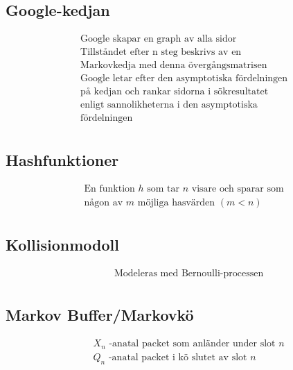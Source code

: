 \begin{multicols}{2}
\subsection{Google-kedjan}
\begin{align*}
  &\text{Google skapar en graph av alla sidor} \\
  &\text{Tillståndet efter n steg beskrivs av en} \\
  &\text{Markovkedja med denna övergångsmatrisen} \\
  &\text{Google letar efter den asymptotiska fördelningen} \\
  &\text{på kedjan och rankar sidorna i sökresultatet} \\
  &\text{enligt sannolikheterna i den asymptotiska} \\
  &\text{fördelningen} \\
\end{align*}

\subsection{Hashfunktioner}
\begin{align*}
  &\text{En funktion $h$ som tar $n$ visare och sparar som} \\
  &\text{någon av $m$ möjliga hasvärden $(m<n)$} \\
\end{align*}

\subsection{Kollisionmodoll}
\begin{align*}
  &\quad  \text{Modeleras med Bernoulli-processen} \\
\end{align*}

\subsection{Markov Buffer/Markovkö}
\begin{align*}
  &\quad  \text{$X_n$ -anatal packet som anländer under slot $n$} \\
  &\quad  \text{$Q_n$ -anatal packet i kö slutet av slot $n$} \\
\end{align*}
\end{multicols}
\raggedcolumns